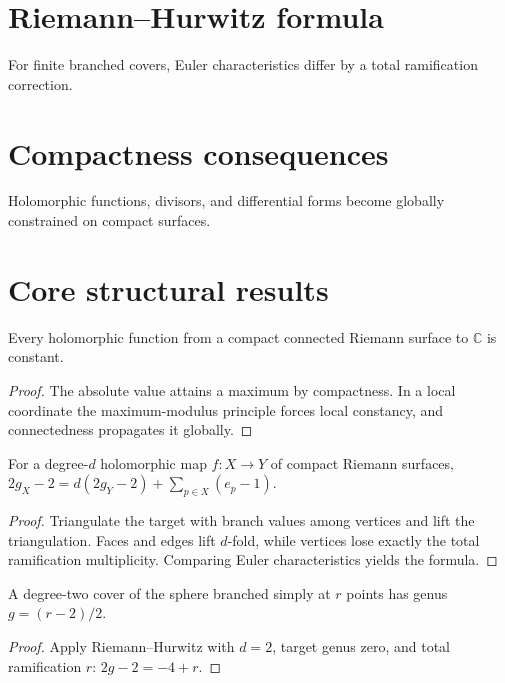 \section{Riemann--Hurwitz formula}
For finite branched covers, Euler characteristics differ by a total ramification correction.

\section{Compactness consequences}
Holomorphic functions, divisors, and differential forms become globally constrained on compact surfaces.

\section{Core structural results}

\begin{theorem}\label{thm:iv26-01}
Every holomorphic function from a compact connected Riemann surface to $\mathbb C$ is constant.
\begin{proof}
The absolute value attains a maximum by compactness. In a local coordinate the maximum-modulus principle forces local constancy, and connectedness propagates it globally.
\end{proof}
\end{theorem}

\begin{theorem}\label{thm:iv26-02}
For a degree-$d$ holomorphic map $f:X\to Y$ of compact Riemann surfaces, $2g_X-2=d(2g_Y-2)+\sum_{p\in X}(e_p-1)$.
\begin{proof}
Triangulate the target with branch values among vertices and lift the triangulation. Faces and edges lift $d$-fold, while vertices lose exactly the total ramification multiplicity. Comparing Euler characteristics yields the formula.
\end{proof}
\end{theorem}

\begin{theorem}\label{thm:iv26-03}
A degree-two cover of the sphere branched simply at $r$ points has genus $g=(r-2)/2$.
\begin{proof}
Apply Riemann--Hurwitz with $d=2$, target genus zero, and total ramification $r$: $2g-2=-4+r$.
\end{proof}
\end{theorem}

